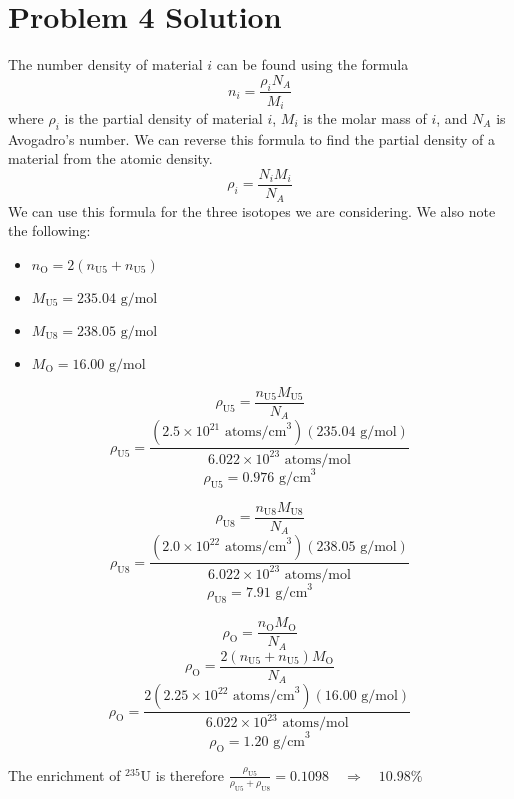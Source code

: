\documentclass{report}
\begin{document}
\section*{Problem 4 Solution}

The number density of material $i$ can be found using the formula
$$ n_i = \frac{\rho_i N_A}{M_i} $$
where $\rho_i$ is the partial density of material $i$, $M_i$ is the molar mass of $i$, and $N_A$ is Avogadro's number. We can reverse this formula to find the partial density of a material from the atomic density.
$$ \rho_i = \frac{N_i M_i}{N_A} $$
We can use this formula for the three isotopes we are considering. We also note the following:
\begin{itemize}
\item $n_{\text{O}} = 2(n_{\text{U5}} + n_{\text{U5}})$
\item $M_{\text{U5}} = 235.04\text{ g/mol}$
\item $M_{\text{U8}} = 238.05\text{ g/mol}$
\item $M_{\text{O}} = 16.00\text{ g/mol}$
\end{itemize}

\begin{multicols}{2}
$$ \rho_{\text{U5}} = \frac{n_{\text{U5}}  M_{\text{U5}} }{N_A} $$
$$ \rho_{\text{U5}} = \frac{(2.5\times10^{21}\text{ atoms/cm}^3)(235.04\text{ g/mol}) }{6.022\times10^{23}\text{ atoms/mol}} $$
$$\boxed{ \rho_{\text{U5}} = 0.976\text{ g/cm}^3 }$$


$$ \rho_{\text{U8}} = \frac{n_{\text{U8}}  M_{\text{U8}} }{N_A} $$
$$ \rho_{\text{U8}} = \frac{(2.0\times10^{22}\text{ atoms/cm}^3)(238.05\text{ g/mol}) }{6.022\times10^{23}\text{ atoms/mol}} $$
$$\boxed{ \rho_{\text{U8}} = 7.91\text{ g/cm}^3 }$$

\end{multicols}

$$ \rho_{\text{O}} = \frac{n_{\text{O}}  M_{\text{O}} }{N_A} $$
$$ \rho_{\text{O}} = \frac{2(n_{\text{U5}} + n_{\text{U5}})  M_{\text{O}} }{N_A} $$
$$ \rho_{\text{O}} = \frac{2(2.25\times10^{22}\text{ atoms/cm}^{3})(16.00\text{ g/mol}) }{6.022\times10^{23}\text{ atoms/mol}} $$
$$\boxed{ \rho_{\text{O}} = 1.20\text{ g/cm}^3 }$$

The enrichment of $^{235}$U is therefore
$\frac{\rho_{\text{U5}}}{\rho_{\text{U5}}+\rho_{\text{U8}}} = 0.1098 \quad\Rightarrow \quad\boxed{10.98\%}$
\end{document}
